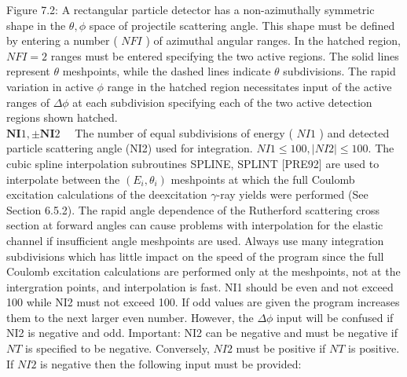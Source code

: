 \documentclass[10pt]{article}
\begin{document}
Figure 7.2: A rectangular particle detector has a non-azimuthally symmetric shape in the $\theta, \phi$ space of projectile scattering angle. This shape must be defined by entering a number ( $N F I$ ) of azimuthal angular ranges. In the hatched region, $N F I=2$ ranges must be entered specifying the two active regions. The solid lines represent $\theta$ meshpoints, while the dashed lines indicate $\theta$ subdivisions. The rapid variation in active $\phi$ range in the hatched region necessitates input of the active ranges of $\Delta \phi$ at each subdivision specifying each of the two active detection regions shown hatched.\\
$\mathbf{N I} 1, \pm \mathbf{N I} 2 \quad$ The number of equal subdivisions of energy ( $N I 1$ ) and detected particle scattering angle (NI2) used for integration. $N I 1 \leq 100,|N I 2| \leq 100$. The cubic spline interpolation subroutines SPLINE, SPLINT [PRE92] are used to interpolate between the $\left(E_{i}, \theta_{i}\right)$ meshpoints at which the full Coulomb excitation calculations of the deexcitation $\gamma$-ray yields were performed (See Section 6.5.2). The rapid angle dependence of the Rutherford scattering cross section at forward angles can cause problems with interpolation for the elastic channel if insufficient angle meshpoints are used. Always use many integration subdivisions which has little impact on the speed of the program since the full Coulomb excitation calculations are performed only at the meshpoints, not at the intergration points, and interpolation is fast. NI1 should be even and not exceed 100 while NI2 must not exceed 100. If odd values are given the program increases them to the next larger even number. However, the $\Delta \phi$ input will be confused if NI2 is negative and odd. Important: NI2 can be negative and must be negative if $N T$ is specified to be negative. Conversely, $N I 2$ must be positive if $N T$ is positive. If $N I 2$ is negative then the following input must be provided:\\
\end{document}
